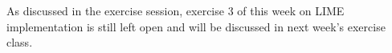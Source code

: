 \documentclass[a4paper]{article}
\begin{document}



\dlz



As discussed in the exercise session, exercise 3 of this week on LIME implementation is still left open and will be discussed in next week's exercise class.


% 


% 
\end{document}
